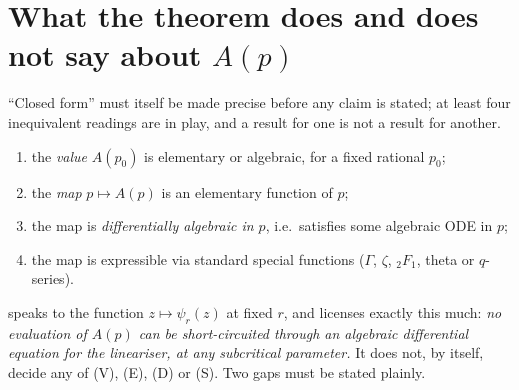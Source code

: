 \section{What the theorem does and does not say about \texorpdfstring{$A(p)$}{A(p)}}
\label{a:sec:scope}

``Closed form'' must itself be made precise before any claim is stated; at least
four inequivalent readings are in play, and a result for one is not a result for
another.
\begin{enumerate}[label=\textup{(\Alph*)},leftmargin=*]
\item[\textbf{(V)}] the \emph{value} $A(p_0)$ is elementary or algebraic, for a
fixed rational $p_0$;
\item[\textbf{(E)}] the \emph{map} $p\mapsto A(p)$ is an elementary function of
$p$;
\item[\textbf{(D)}] the map is \emph{differentially algebraic in $p$}, i.e.\
satisfies some algebraic ODE in $p$;
\item[\textbf{(S)}] the map is expressible via standard special functions
($\Gamma$, $\zeta$, ${}_2F_1$, theta or $q$-series).
\end{enumerate}
 speaks to the function $z\mapsto\psi_r(z)$ at fixed $r$, and
licenses exactly this much: \emph{no evaluation of $A(p)$ can be short-circuited
through an algebraic differential equation for the lineariser, at any subcritical
parameter.} It does not, by itself, decide any of (V), (E), (D) or (S). Two gaps
must be stated plainly.

